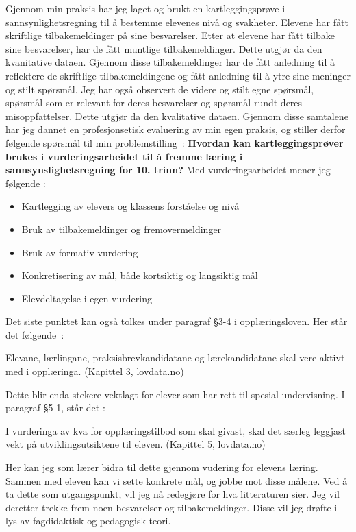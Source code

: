 \documentclass[main.tex]{subfiles}
\begin{document}
Gjennom min praksis har jeg laget og brukt en kartleggingsprøve i sannsynlighetsregning til å bestemme
elevenes nivå og svakheter. Elevene har fått skriftlige tilbakemeldinger på sine besvarelser.
Etter at elevene har fått tilbake sine besvarelser, har de fått muntlige tilbakemeldinger. Dette utgjør da 
den kvanitative dataen. Gjennom disse tilbakemeldinger har de fått anledning til å reflektere
de skriftlige tilbakemeldingene og fått anledning til å ytre sine meninger og stilt spørsmål. Jeg har også
observert de videre og stilt egne spørsmål, spørsmål som er relevant for deres besvarelser og spørsmål
rundt deres misoppfattelser. Dette utgjør da den kvalitative dataen. Gjennom disse samtalene har jeg dannet 
en profesjonsetisk evaluering av min egen praksis, og stiller derfor følgende spørsmål til min \mbox{problemstilling :}
\newline
\newline
\textbf{Hvordan kan kartleggingsprøver brukes i vurderingsarbeidet til å fremme læring i 
        sannsynslighetsregning for 10. trinn?}
\newline
\newline
Med vurderingsarbeidet mener jeg følgende :
\begin{itemize}
\item Kartlegging av elevers og klassens forståelse og nivå
\item Bruk av tilbakemeldinger og fremovermeldinger
\item Bruk av formativ vurdering
\item Konkretisering av mål, både kortsiktig og langsiktig mål
\item Elevdeltagelse i egen vurdering
\end{itemize}

Det siste punktet kan også tolkes under paragraf \S 3-4 i opplæringsloven. Her står det \mbox{følgende :}
\begin{displayquote}
Elevane, lærlingane, praksisbrevkandidatane og lærekandidatane skal vere aktivt med i opplæringa.
(Kapittel 3, lovdata.no)
\end{displayquote}
Dette blir enda stekere vektlagt for elever som har rett til spesial undervisning. I paragraf \S 5-1, står det :
\begin{displayquote}
I vurderinga av kva for opplæringstilbod som skal givast, skal det særleg leggjast vekt på utviklingsutsiktene til eleven.
(Kapittel 5, lovdata.no)
\end{displayquote}
Her kan jeg som lærer bidra til dette gjennom vudering for elevens læring. Sammen med eleven kan vi sette konkrete mål,
og jobbe mot disse målene. Ved å ta dette som utgangspunkt, vil jeg nå redegjøre for hva litteraturen sier.
Jeg vil deretter trekke frem noen besvarelser og tilbakemeldinger. Disse vil jeg drøfte i lys av fagdidaktisk og 
pedagogisk teori.
\end{document}
